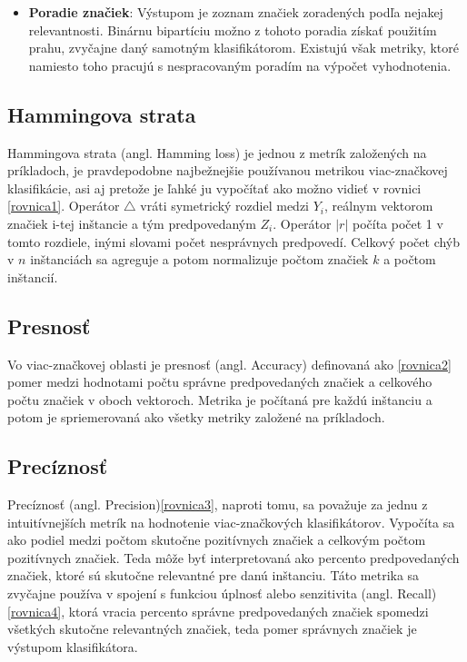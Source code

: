 \begin{itemize}
\begin{itemize}
    \item \textbf{Poradie značiek}: Výstupom je zoznam značiek zoradených podľa nejakej relevantnosti. Binárnu bipartíciu možno z tohoto poradia získať použitím prahu, zvyčajne daný samotným klasifikátorom. Existujú však metriky, ktoré namiesto toho pracujú s nespracovaným poradím na výpočet vyhodnotenia.
    \end{itemize}
\end{itemize}

\subsection*{Hammingova strata} 
Hammingova strata (angl. Hamming loss) je jednou z metrík založených na príkladoch, je pravdepodobne najbežnejšie používanou metrikou viac-značkovej klasifikácie, asi aj pretože je ľahké ju vypočítať ako možno vidieť v rovnici \eqref{rovnica1}. Operátor \(\bigtriangleup\) vráti symetrický rozdiel medzi \(Y_{i}\), reálnym vektorom značiek i-tej inštancie a tým predpovedaným \(Z_{i}\). Operátor \(|r|\) počíta počet 1 v tomto rozdiele, inými slovami počet nesprávnych predpovedí. Celkový počet chýb v \(n\) inštanciách sa agreguje a potom normalizuje počtom značiek \(k\) a počtom inštancií.

\subsection*{Presnosť} 

Vo viac-značkovej oblasti je presnosť (angl. Accuracy) definovaná ako \eqref{rovnica2} pomer medzi hodnotami počtu správne predpovedaných značiek a celkového počtu značiek v oboch vektoroch. Metrika je počítaná pre každú inštanciu a potom je spriemerovaná ako všetky metriky založené na príkladoch.

\subsection*{Precíznosť} 
Precíznosť (angl. Precision)\eqref{rovnica3}, naproti tomu, sa považuje za jednu z intuitívnejších metrík na hodnotenie viac-značkových klasifikátorov. Vypočíta sa ako podiel medzi počtom skutočne pozitívnych značiek a celkovým počtom pozitívnych značiek. Teda môže byť interpretovaná ako percento predpovedaných značiek, ktoré sú skutočne relevantné pre danú inštanciu. Táto metrika sa zvyčajne používa v spojení s funkciou úplnosť alebo senzitivita (angl. Recall) \eqref{rovnica4}, ktorá vracia percento správne predpovedaných značiek spomedzi všetkých skutočne relevantných značiek, teda pomer správnych značiek je výstupom klasifikátora.

